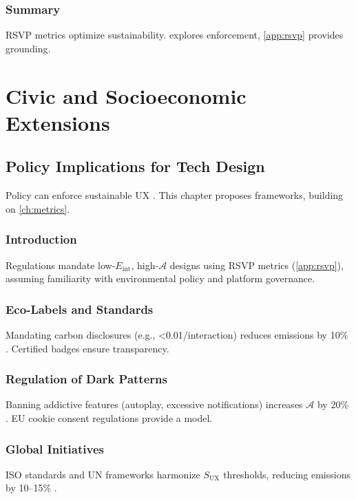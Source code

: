 \documentclass[openany]{book}
\newcommand{\Eint}{E_{\mathrm{int}}} %
\newcommand{\Auton}{\mathcal{A}} %
\newcommand{\SUX}{S_{\mathrm{UX}}} %
\begin{document}
\section{Summary}
RSVP metrics optimize sustainability.  explores enforcement, \cref{app:rsvp} provides grounding.

\part{Civic and Socioeconomic Extensions}

\chapter{Policy Implications for Tech Design}
\label{ch:policy}

Policy can enforce sustainable UX \citep{adobe2021,doctorow2022}. This chapter proposes frameworks, building on \cref{ch:metrics}.

\section{Introduction}
\label{sec:policy-intro}
Regulations mandate low-\(\Eint\), high-\(\Auton\) designs using RSVP metrics (\cref{app:rsvp}), assuming familiarity with environmental policy and platform governance.

\section{Eco-Labels and Standards}
\label{sec:policy-labels}
Mandating carbon disclosures (e.g., \SI{<0.01}{\kgCOe}/interaction) reduces emissions by 10\% \citep{adobe2021,extentia2024}. Certified badges ensure transparency.

\section{Regulation of Dark Patterns}
\label{sec:policy-dark}
Banning addictive features (autoplay, excessive notifications) increases \(\Auton\) by 20\% \citep{colak2024,doctorow2022}. EU cookie consent regulations provide a model.

\section{Global Initiatives}
\label{sec:policy-global}
ISO standards and UN frameworks harmonize \(\SUX\) thresholds, reducing emissions by 10--15\% \citep{adobe2021,extentia2024}.
\end{document}
